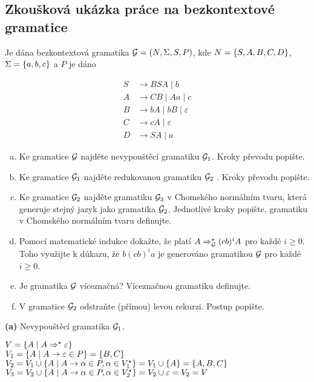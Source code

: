 \subsection{Zkoušková ukázka práce na bezkontextové gramatice}
Je dána bezkontextová gramatika $\mathcal{G} = (N, \Sigma, S, P)$, kde $N = \left\lbrace S,A,B,C,D \right\rbrace$, $\Sigma = \left\lbrace a,b,c \right\rbrace$ a $P$ je dáno

\begin{align*}
    S &\rightarrow BSA \mid b \\
    A &\rightarrow CB \mid Aa \mid c \\
    B &\rightarrow bA \mid bB \mid \varepsilon \\
    C &\rightarrow cA \mid \varepsilon \\
    D &\rightarrow SA \mid a
\end{align*}

\begin{enumerate}[(a), noitemsep]
    \item Ke gramatice $\mathcal{G}$ najděte nevypouštěcí gramatiku $\mathcal{G}_1$. Kroky převodu popište.
    \item Ke gramatice $\mathcal{G}_1$ najděte redukovanou gramatiku $\mathcal{G}_2$ . Kroky převodu popište.
    \item Ke gramatice $\mathcal{G}_2$ najděte gramatiku $\mathcal{G}_3$ v Chomského normálním tvaru, která generuje stejný jazyk jako 
    gramatika $\mathcal{G}_2$. Jednotlivé kroky popište, gramatiku v Chomského normálním tvaru definujte.
    \item Pomocí matematické indukce dokažte, že platí $A \Rightarrow_{\mathcal{G}}^\star (cb)^i A$ pro každé $i \geq 0$.
    Toho využijte k důkazu, že $b(cb)^i a$ je generováno gramatikou $\mathcal{G}$ pro každé $i \geq 0$.
    \item Je gramatika $\mathcal{G}$ víceznačná? Víceznačnou gramatiku definujte.
    \item V gramatice $\mathcal{G}_2$ odstraňte (přímou) levou rekurzi. Postup popište.
\end{enumerate}

\textbf{(a)} Nevypouštěcí gramatika $\mathcal{G}_1$.

$V = \left\lbrace A \mid A \Rightarrow^\star \varepsilon  \right\rbrace$\\
$V_1 = \left\lbrace A \mid A \rightarrow \varepsilon \in P \right\rbrace = \left\lbrace B, C \right\rbrace$\\
$V_2 = V_1 \cup \left\lbrace A \mid A \rightarrow \alpha \in P, \alpha \in V_1^{\star} \right\rbrace = V_1 \cup \left\lbrace A \right\rbrace = \left\lbrace A, B, C \right\rbrace$\\
$V_3 = V_2 \cup \left\lbrace A \mid A \rightarrow \alpha \in P, \alpha \in V_2^{\star} \right\rbrace = V_2 \cup \varepsilon = V_2 = V$


